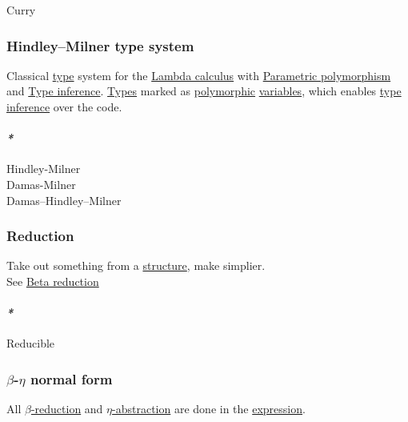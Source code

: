 \documentclass[11pt]{article}
\begin{document}
\label{orgea8bb21}Curry\\

\subsubsection{\label{orgb06b7b3}Hindley–Milner type system}
\label{sec:org09cf4b7}
Classical \hyperref[orgc4aea2f]{type} system for the \hyperref[org37da5f9]{Lambda calculus} with \hyperref[org3c0b242]{Parametric polymorphism} and \hyperref[orgf93c945]{Type inference}. \hyperref[org4209edd]{Types} marked as \hyperref[orgac4d581]{polymorphic} \hyperref[orge17f54f]{variables}, which enables \hyperref[orgf93c945]{type inference} over the code.\\

\paragraph{\emph{*}}
\label{sec:org638c537}

\label{org45f61be}Hindley-Milner\\
\label{org4b8c3ed}Damas-Milner\\
\label{org8c5f028}Damas–Hindley–Milner\\

\subsubsection{\label{org7bec118}Reduction}
\label{sec:org0e19ade}
Take out something from a \hyperref[org8051f61]{structure}, make simplier.\\

See \hyperref[org3321bb3]{Beta reduction}\\

\paragraph{\emph{*}}
\label{sec:org469c44f}

\label{org433cf42}Reducible\\

\subsubsection{\label{org4593f29}\(\beta\)-\(\eta\) normal form}
\label{sec:org21bcd05}
All \hyperref[org687fe93]{\(\beta\)-reduction} and \hyperref[orgc6f3f7d]{\(\eta\)-abstraction} are done in the \hyperref[org9021dd7]{expression}.\\
\end{document}
